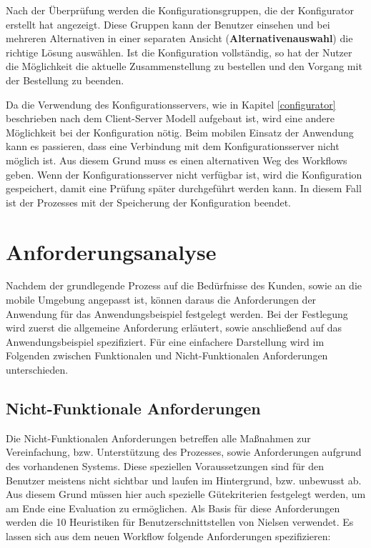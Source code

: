 Nach der Überprüfung werden die  Konfigurationsgruppen, die der Konfigurator erstellt hat angezeigt. Diese Gruppen kann der Benutzer einsehen und bei mehreren Alternativen in einer 
separaten Ansicht (\textbf{Alternativenauswahl}) die richtige Lösung auswählen. Ist die Konfiguration vollständig, so hat der Nutzer die Möglichkeit die aktuelle Zusammenstellung zu bestellen und den Vorgang mit der Bestellung zu beenden. 

Da die Verwendung des Konfigurationsservers, wie in Kapitel \ref{configurator} beschrieben nach dem Client-Server Modell aufgebaut ist, wird eine andere Möglichkeit bei der Konfiguration nötig. Beim mobilen Einsatz der Anwendung kann es passieren, dass eine Verbindung mit dem Konfigurationsserver nicht möglich ist. Aus diesem Grund muss es einen alternativen Weg des Workflows geben. Wenn der Konfigurationsserver nicht verfügbar ist, wird die Konfiguration gespeichert, damit eine Prüfung später durchgeführt werden kann. In diesem Fall ist der Prozesses mit der Speicherung der Konfiguration beendet.


\section{Anforderungsanalyse} \label{requirements}
Nachdem der grundlegende Prozess auf die Bedürfnisse des Kunden, sowie an die mobile Umgebung angepasst ist, können daraus die Anforderungen der Anwendung für das Anwendungsbeispiel festgelegt werden. Bei der Festlegung wird zuerst die allgemeine Anforderung erläutert, sowie anschließend auf das Anwendungsbeispiel spezifiziert. Für eine einfachere Darstellung wird im Folgenden zwischen Funktionalen und Nicht-Funktionalen Anforderungen unterschieden. 

\subsection{Nicht-Funktionale Anforderungen}\label{non_functional_requirements}
Die Nicht-Funktionalen Anforderungen betreffen alle Maßnahmen zur Vereinfachung, bzw. Unterstützung des Prozesses, sowie Anforderungen aufgrund des vorhandenen Systems. Diese speziellen Voraussetzungen sind für den Benutzer meistens nicht sichtbar und laufen im Hintergrund, bzw. unbewusst ab. Aus diesem Grund müssen hier auch spezielle Gütekriterien festgelegt werden, um am Ende eine Evaluation zu ermöglichen. Als Basis für diese Anforderungen werden die 10 Heuristiken für Benutzerschnittstellen von Nielsen \cite{bib:heuristicsNielsen} verwendet.
Es lassen sich aus dem neuen Workflow folgende Anforderungen spezifizieren:


